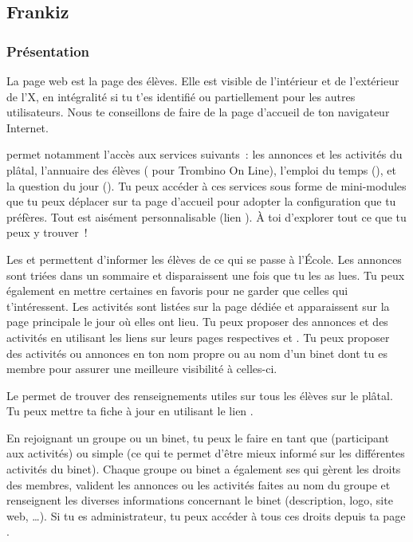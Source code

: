\subsection{Frankiz}


\subsubsection{Présentation}

\label{frankiz} La page web \fkz est la page des élèves. Elle est visible de l'intérieur et de
l'extérieur de l'X, en intégralité si tu t'es identifié ou partiellement pour les autres
utilisateurs. Nous te conseillons de faire de  la page d'accueil de ton navigateur Internet.

\fkz permet notamment l'accès aux services suivants~: les
annonces et les activités du plâtal, l'annuaire des élèves
( pour Trombino On Line), l'emploi du temps (), et la question du jour (). Tu peux accéder à ces services sous forme de mini-modules que tu peux déplacer sur ta page d'accueil pour adopter la configuration que tu préfères.
Tout est aisément personnalisable (lien ). À toi d'explorer tout ce que tu peux y trouver~!

Les  et  permettent d'informer les élèves de ce qui se passe à  l'École. Les annonces sont triées dans
un sommaire et disparaissent une fois que tu les as lues. Tu peux également en mettre certaines en favoris pour ne garder que celles qui t'intéressent. Les activités sont listées sur la page dédiée et apparaissent
sur la page principale le jour où elles ont lieu. Tu peux proposer des annonces et des activités en utilisant les liens sur leurs pages respectives  et . Tu peux proposer des activités ou annonces en ton nom propre ou au nom d'un binet dont tu es membre pour assurer une meilleure visibilité à celles-ci.

Le  permet de trouver des renseignements utiles sur
tous les élèves sur le plâtal. Tu peux mettre ta fiche à  jour en
utilisant le lien .

En rejoignant un groupe ou un binet, tu peux le faire en tant que  (participant aux activités) ou simple  (ce qui te permet d'être mieux informé sur les différentes activités du binet). Chaque groupe ou binet a également ses  qui gèrent les droits des membres, valident les annonces ou les activités faites au nom du groupe et renseignent les diverses informations concernant le binet (description, logo, site web, \dots). Si tu es administrateur, tu peux accéder à tous ces droits depuis ta page .


